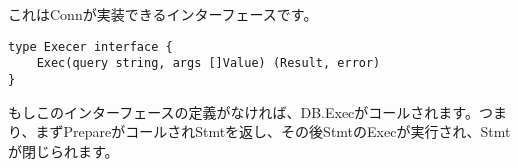 これはConnが実装できるインターフェースです。

\begin{lstlisting}[numbers=none]
type Execer interface {
    Exec(query string, args []Value) (Result, error)
}
\end{lstlisting}

もしこのインターフェースの定義がなければ、DB.Execがコールされます。つまり、まずPrepareがコールされStmtを返し、その後StmtのExecが実行され、Stmtが閉じられます。
